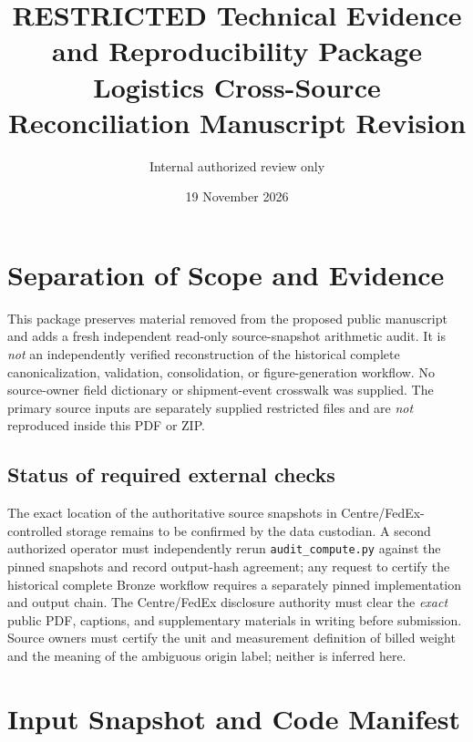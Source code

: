 \documentclass[11pt]{article}
\title{RESTRICTED Technical Evidence and Reproducibility Package\\\large Logistics Cross-Source Reconciliation Manuscript Revision}
\author{Internal authorized review only}
\date{19 November 2026}
\begin{document}
\maketitle
\begin{center}\end{center}

\section{Separation of Scope and Evidence}
This package preserves material removed from the proposed public manuscript and adds a fresh independent read-only source-snapshot arithmetic audit. It is \emph{not} an independently verified reconstruction of the historical complete canonicalization, validation, consolidation, or figure-generation workflow. No source-owner field dictionary or shipment-event crosswalk was supplied. The primary source inputs are separately supplied restricted files and are \emph{not} reproduced inside this PDF or ZIP.

\subsection{Status of required external checks}
The exact location of the authoritative source snapshots in Centre/FedEx-controlled storage remains to be confirmed by the data custodian. A second authorized operator must independently rerun \texttt{audit\_compute.py} against the pinned snapshots and record output-hash agreement; any request to certify the historical complete Bronze workflow requires a separately pinned implementation and output chain. The Centre/FedEx disclosure authority must clear the \emph{exact} public PDF, captions, and supplementary materials in writing before submission. Source owners must certify the unit and measurement definition of billed weight and the meaning of the ambiguous origin label; neither is inferred here.

\section{Input Snapshot and Code Manifest}
\end{document}
